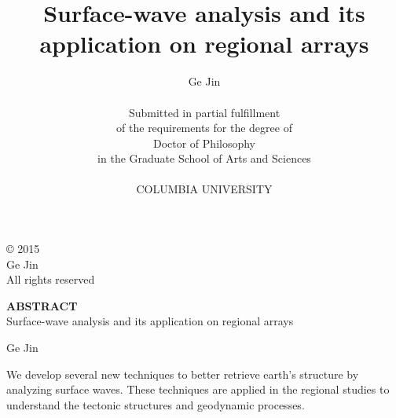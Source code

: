 \begin{titlepage}
\singlespacing
\title{Surface-wave analysis and its application on regional arrays}
\author{Ge Jin\\
\vspace{272pt}\\
Submitted in partial fulfillment \\
of the requirements
for the degree of \\
Doctor of Philosophy \\
in the Graduate School of Arts and Sciences \\
\vspace{24pt}\\
COLUMBIA UNIVERSITY \\}
\maketitle
\end{titlepage}

\vspace{10cm}
\singlespacing
\null
\begin{center}
\begin{bottompar}
{\large \copyright  \hspace{1mm} 2015 \\
Ge Jin\\
All rights reserved}
\end{bottompar}

\doublespacing
\large
{\bf ABSTRACT}\\
Surface-wave analysis and its application on regional arrays

Ge Jin
\end{center}
\doublespacing

We develop several new techniques to better retrieve earth's structure by analyzing surface waves. These techniques are applied in the regional studies to understand the tectonic structures and geodynamic processes.

